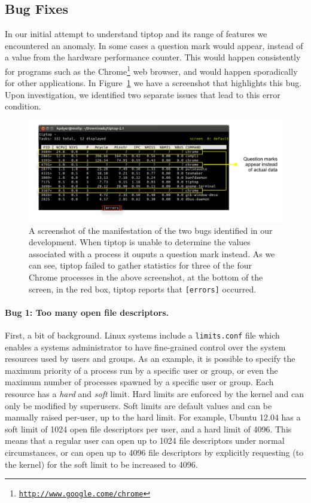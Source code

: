 \subsection{Bug Fixes}
In our initial attempt to understand tiptop and its range of features we encountered an anomaly.
In some cases a question mark would appear, instead of a value from the hardware performance counter.
This would happen consistently for programs such as the Chrome\footnote{\texttt{\url{http://www.google.come/chrome}}} web browser, and would happen sporadically for other applications.
In Figure~\ref{fig:tiptop-bug} we have a screenshot that highlights this bug.
Upon investigation, we identified two separate issues that lead to this error condition.
\begin{figure}[t]
\footnotesize
\centering
\includegraphics[width=.9\textwidth]{tiptop-bug}
\caption{A screenshot of the manifestation of the two bugs identified in our development. When tiptop is unable to determine the values associated with a process it ouputs a question mark instead. As we can see, tiptop failed to gather statistics for three of the four Chrome processes in the above screenshot, at the bottom of the screen, in the red box, tiptop reports that \texttt{[errors]} occurred.}
\label{fig:tiptop-bug}
\end{figure}

\paragraph{Bug 1: Too many open file descriptors.}
First, a bit of background. Linux systems include a \texttt{limits.conf} file which enables a systems administrator to have fine-grained control over the system resources used by users and groups.
As an example, it is possible to specify the maximum priority of a process run by a specific user or group, or even the maximum number of processes spawned by a specific user or group. Each resource has a \emph{hard} and \emph{soft} limit. Hard limits are enforced by the kernel and can only be modified by superusers. Soft limits are default values and can be manually raised per-user, up to the hard limit.
For example, Ubuntu 12.04 has a soft limit of 1024 open file descriptors per user, and a hard limit of 4096.
This means that a regular user can open up to 1024 file descriptors under normal circumstances, or can open up to 4096 file descriptors by explicitly requesting (to the kernel) for the soft limit to be increased to 4096.


